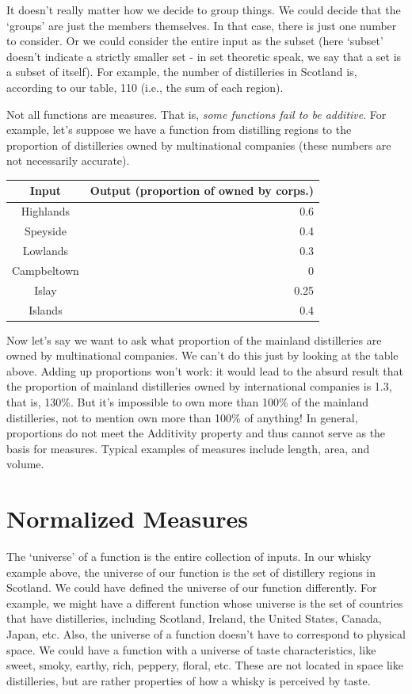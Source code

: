 \documentclass[]{tufte-book}
\begin{document}
It doesn't really matter how we decide to group things. We could decide that the `groups' are just the members themselves. In that case, there is just one number to consider. Or we could consider the entire input as the subset (here `subset' doesn't indicate a strictly smaller set - in set theoretic speak, we say that a set is a subset of itself). For example, the number of distilleries in Scotland is, according to our table, 110 (i.e., the sum of each region).

Not all functions are measures. That is, \emph{some functions fail to be additive}. For example, let's suppose we have a function from distilling regions to the proportion of distilleries owned by multinational companies (these numbers are not necessarily accurate).

\begin{longtable}[]{@{}cr@{}}
\toprule
Input & Output (proportion of owned by corps.)\tabularnewline
\midrule
\endhead
Highlands & 0.6\tabularnewline
Speyside & 0.4\tabularnewline
Lowlands & 0.3\tabularnewline
Campbeltown & 0\tabularnewline
Islay & 0.25\tabularnewline
Islands & 0.4\tabularnewline
\bottomrule
\end{longtable}

Now let's say we want to ask what proportion of the mainland distilleries are owned by multinational companies. We can't do this just by looking at the table above. Adding up proportions won't work: it would lead to the absurd result that the proportion of mainland distilleries owned by international companies is 1.3, that is, 130\%. But it's impossible to own more than 100\% of the mainland distilleries, not to mention own more than 100\% of anything! In general, proportions do not meet the Additivity property and thus cannot serve as the basis for measures. Typical examples of measures include length, area, and volume.

\hypertarget{normalized-measures}{%
\section{Normalized Measures}\label{normalized-measures}}

The `universe' of a function is the entire collection of inputs. In our whisky example above, the universe of our function is the set of distillery regions in Scotland. We could have defined the universe of our function differently. For example, we might have a different function whose universe is the set of countries that have distilleries, including Scotland, Ireland, the United States, Canada, Japan, etc. Also, the universe of a function doesn't have to correspond to physical space. We could have a function with a universe of taste characteristics, like sweet, smoky, earthy, rich, peppery, floral, etc. These are not located in space like distilleries, but are rather properties of how a whisky is perceived by taste.
\end{document}
